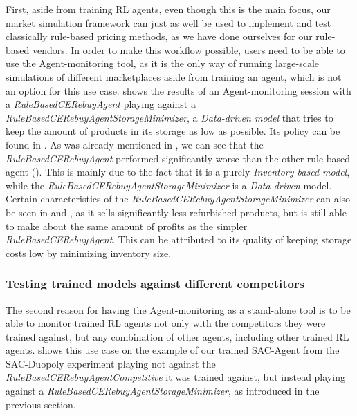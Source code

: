 First, aside from training RL agents, even though this is the main focus, our market simulation framework can just as well be used to implement and test classically rule-based pricing methods, as we have done ourselves for our rule-based vendors. In order to make this workflow possible, users need to be able to use the Agent-monitoring tool, as it is the only way of running large-scale simulations of different marketplaces aside from training an agent, which is not an option for this use case.  shows the results of an Agent-monitoring session with a \emph{RuleBasedCERebuyAgent} playing against a \emph{RuleBasedCERebuyAgentStorageMinimizer}, a \emph{Data-driven model} that tries to keep the amount of products in its storage as low as possible. Its policy can be found in . As was already mentioned in , we can see that the \emph{RuleBasedCERebuyAgent} performed significantly worse than the other rule-based agent (). This is mainly due to the fact that it is a purely \emph{Inventory-based model}, while the \emph{RuleBasedCERebuyAgentStorageMinimizer} is a \emph{Data-driven} model. Certain characteristics of the \emph{RuleBasedCERebuyAgentStorageMinimizer} can also be seen in  and , as it sells significantly less refurbished products, but is still able to make about the same amount of profits as the simpler \emph{RuleBasedCERebuyAgent}. This can be attributed to its quality of keeping storage costs low by minimizing inventory size.

\subsubsection{Testing trained models against different competitors}

The second reason for having the Agent-monitoring as a stand-alone tool is to be able to monitor trained RL agents not only with the competitors they were trained against, but any combination of other agents, including other trained RL agents.  shows this use case on the example of our trained SAC-Agent from the SAC-Duopoly experiment playing not against the \emph{RuleBasedCERebuyAgentCompetitive} it was trained against, but instead playing against a \emph{RuleBasedCERebuyAgentStorageMinimizer}, as introduced in the previous section.

